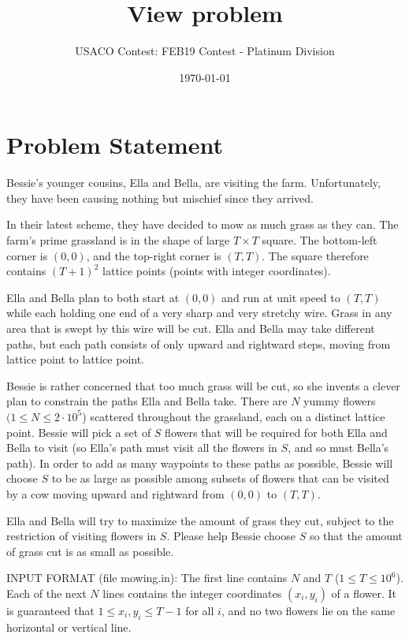 \documentclass[12pt]{article}
\title{View problem}
\author{USACO Contest: FEB19 Contest - Platinum Division}
\date{\today}
\begin{document}
\maketitle

\section*{Problem Statement}

Bessie's younger cousins, Ella and Bella, are visiting the farm. Unfortunately,
they have been causing nothing but mischief since they arrived.

In their latest scheme, they have decided to mow as much grass as they can. The
farm's prime grassland is in the shape of large $T \times T$ square. The
bottom-left corner is $(0,0)$, and the top-right corner is $(T,T)$.  The square 
therefore contains $(T+1)^2$ lattice points (points with integer coordinates). 

Ella and Bella plan to both start at $(0,0)$ and run at unit speed to $(T, T)$
while each holding one end of a very sharp and very stretchy wire.  Grass in any
area that is swept by this wire will be cut.  Ella and Bella may take different
paths, but each path consists of only upward and rightward steps, moving from
lattice point to lattice point.

Bessie is rather concerned that too much grass will be cut, so she invents a 
clever plan to constrain the paths Ella and Bella take.  There are $N$ yummy
flowers $(1 \leq N \leq 2 \cdot 10^5$) scattered throughout the grassland, each
on a distinct lattice point.  Bessie will pick a set of $S$ flowers that will be
required for both Ella and Bella to visit (so Ella's path must visit all the 
flowers in $S$, and so must Bella's path).  In order to add as many waypoints to
these paths as possible, Bessie will choose $S$ to be as large as possible among
subsets of flowers that can be visited by a cow moving upward and rightward from
$(0,0)$ to $(T,T)$.

Ella and Bella will try to maximize the amount of grass they cut, subject to the
restriction of visiting flowers in $S$.  Please help Bessie choose $S$ so that
the amount of grass cut is as small as possible.  

INPUT FORMAT (file mowing.in):
The first line contains $N$ and $T$ ($1 \leq T \leq 10^6$). Each of the next $N$
lines contains the integer coordinates $(x_i, y_i)$ of a flower. It is
guaranteed that $1 \leq x_i, y_i \leq T-1$ for all $i$, and no two flowers lie
on the same horizontal or vertical line.
\end{document}
